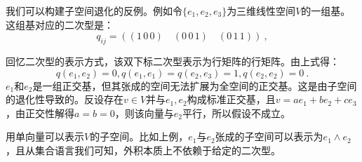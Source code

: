 我们可以构建子空间退化的反例。例如令$\{e_1,e_2,e_3\}$为三维线性空间$V$的一组基。这组基对应的二次型是：
\begin{equation}
q_{ij}=((1\,0\,0)\quad (0\,0\,1)\quad(0\,1\,1))~,
\end{equation}

回忆二次型的表示方式，该双下标二次型表示为行矩阵的行矩阵。由上式得：$$q(e_1,e_2)=0,q(e_1,e_1)=q(e_2,e_3)=1,q(e_2,e_2)=0~.$$
$e_1$和$e_2$是一组正交基，但其张成的空间无法扩展为全空间的正交基。这是由子空间的退化性导致的。反设存在$v\in V$并与$e_1,e_2$构成标准正交基，且$v=ae_1+be_2+ce_3$，由正交性解得$a=b=0$，则该向量与$e_2$平行，所以假设不成立。

用单向量可以表示$V$的子空间。比如上例，$e_1$与$e_2$张成的子空间可以表示为$e_1\wedge e_2$，且从集合语言我们可知，外积本质上不依赖于给定的二次型。